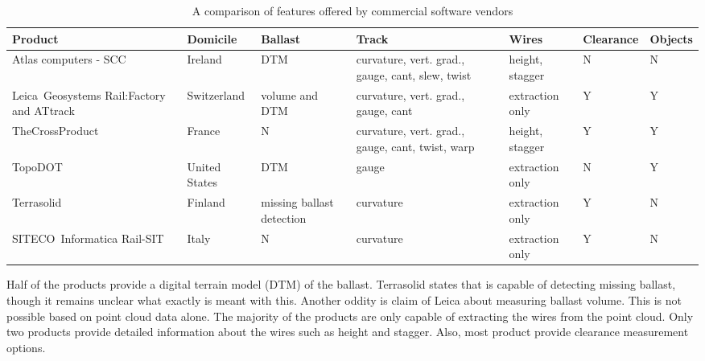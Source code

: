 \begin{landscape}
\begin{table}[!ht]
    \centering
    \begin{tabular}{%
	>{\raggedright\arraybackslash}p{3cm}%
	ll%
	>{\raggedright\arraybackslash}p{3cm}%
	p{2cm}ll}\toprule
         \textbf{Product} & \textbf{Domicile} & \textbf{Ballast} & \textbf{Track} & \textbf{Wires} & \textbf{Clearance}  & \textbf{Objects}\\\midrule
         Atlas computers - SCC & Ireland & 
         DTM &
         curvature, vert. grad., gauge, cant, slew, twist  &
         height, stagger & N & N \\
         \addlinespace
         
         Leica~Geosystems Rail:Factory and ATtrack & Switzerland &
         volume and DTM &
         curvature, vert. grad., gauge, cant &
         extraction only & Y & Y \\
         \addlinespace
         
         TheCrossProduct & France &
         N &
         curvature, vert. grad., gauge, cant, twist, warp  &
         height, stagger & Y & Y\\
         \addlinespace
         
         TopoDOT & United States &
         DTM &
         gauge & 
         extraction only & N & Y\\
         \addlinespace
         
         Terrasolid & Finland &
         missing ballast detection &
         curvature &
         extraction only & Y & N\\
         \addlinespace
         
         SITECO~Informatica {Rail-SIT} & Italy &
         N &
         curvature &
         extraction only & Y & N\\         
     \bottomrule
    \end{tabular}

    \caption{A comparison of features offered by commercial software vendors}
    \label{tbl:stoa:software}
\end{table}
\end{landscape}

Half of the products provide a digital terrain model (DTM) of the ballast. Terrasolid states that is capable of detecting missing ballast, though it remains unclear what exactly is meant with this. Another oddity is claim of Leica about measuring ballast volume. This is not possible based on point cloud data alone. The majority of the products are only capable of extracting the wires from the point cloud. Only two products provide detailed information about the wires such as height and stagger. Also, most product provide clearance measurement options.

